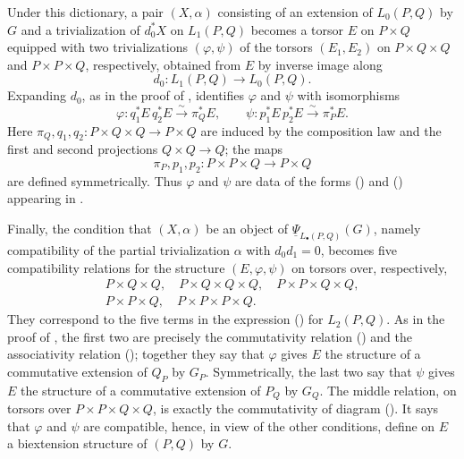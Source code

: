 Under this dictionary, a pair $(X,\alpha)$ consisting of an
extension of $L_0(P,Q)$ by $G$ and a trivialization of
$d_0^*X$ on $L_1(P,Q)$ becomes a torsor $E$ on $P\times Q$ equipped
with two trivializations $(\varphi,\psi)$ of the torsors
$(E_1,E_2)$ on $P\times Q\times Q$ and
$P\times P\times Q$, respectively, obtained from $E$ by inverse
image along
\[
 d_0:L_1(P,Q)\longrightarrow L_0(P,Q).
\]
Expanding $d_0$, as in the proof of , identifies
$\varphi$ and $\psi$ with isomorphisms
\[
 \varphi:q_1^*E\,q_2^*E\xrightarrow{\sim}\pi_Q^*E,
 \qquad
 \psi:p_1^*E\,p_2^*E\xrightarrow{\sim}\pi_P^*E.
\]
Here $\pi_Q,q_1,q_2:P\times Q\times Q\longrightarrow P\times Q$
are induced by the composition law and the first and second
projections $Q\times Q\longrightarrow Q$; the maps
\[
 \pi_P,p_1,p_2:P\times P\times Q\longrightarrow P\times Q
\]
are defined symmetrically.  Thus $\varphi$ and $\psi$ are data of
the forms () and () appearing in .

Finally, the condition that $(X,\alpha)$ be an object of
$\underline\Psi_{L_\bullet(P,Q)}(G)$, namely compatibility of the
partial trivialization $\alpha$ with $d_0d_1=0$, becomes five
compatibility relations for the structure $(E,\varphi,\psi)$ on
torsors over, respectively,
\[
\begin{gathered}
 P\times Q\times Q,\quad
 P\times Q\times Q\times Q,\quad
 P\times P\times Q\times Q,\\
 P\times P\times Q,\quad
 P\times P\times P\times Q.
\end{gathered}
\]
They correspond to the five terms in the expression () for
$L_2(P,Q)$.  As in the proof of , the first two are precisely
the commutativity relation () and the associativity relation
(); together they say that $\varphi$ gives $E$ the structure
of a commutative extension of $Q_P$ by $G_P$.  Symmetrically, the
last two say that $\psi$ gives $E$ the structure of a commutative
extension of $P_Q$ by $G_Q$.  The middle relation, on torsors over
$P\times P\times Q\times Q$, is exactly the commutativity of
diagram ().  It says that $\varphi$ and $\psi$ are compatible,
hence, in view of the other conditions, define on $E$ a
biextension structure of $(P,Q)$ by $G$.

